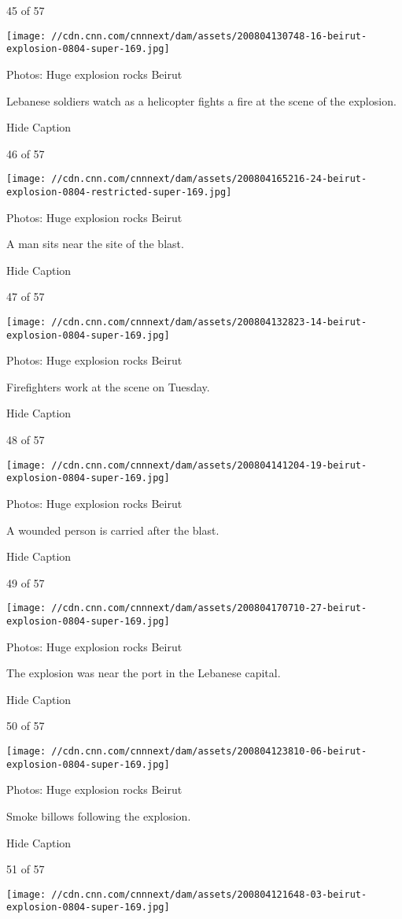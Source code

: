 45 of 57

\texttt{[image: //cdn.cnn.com/cnnnext/dam/assets/200804130748-16-beirut-explosion-0804-super-169.jpg]}

Photos: Huge explosion rocks Beirut

Lebanese soldiers watch as a helicopter fights a fire at the scene of
the explosion.

Hide Caption

46 of 57

\texttt{[image: //cdn.cnn.com/cnnnext/dam/assets/200804165216-24-beirut-explosion-0804-restricted-super-169.jpg]}

Photos: Huge explosion rocks Beirut

A man sits near the site of the blast.

Hide Caption

47 of 57

\texttt{[image: //cdn.cnn.com/cnnnext/dam/assets/200804132823-14-beirut-explosion-0804-super-169.jpg]}

Photos: Huge explosion rocks Beirut

Firefighters work at the scene on Tuesday.

Hide Caption

48 of 57

\texttt{[image: //cdn.cnn.com/cnnnext/dam/assets/200804141204-19-beirut-explosion-0804-super-169.jpg]}

Photos: Huge explosion rocks Beirut

A wounded person is carried after the blast.

Hide Caption

49 of 57

\texttt{[image: //cdn.cnn.com/cnnnext/dam/assets/200804170710-27-beirut-explosion-0804-super-169.jpg]}

Photos: Huge explosion rocks Beirut

The explosion was near the port in the Lebanese capital.

Hide Caption

50 of 57

\texttt{[image: //cdn.cnn.com/cnnnext/dam/assets/200804123810-06-beirut-explosion-0804-super-169.jpg]}

Photos: Huge explosion rocks Beirut

Smoke billows following the explosion.

Hide Caption

51 of 57

\texttt{[image: //cdn.cnn.com/cnnnext/dam/assets/200804121648-03-beirut-explosion-0804-super-169.jpg]}

